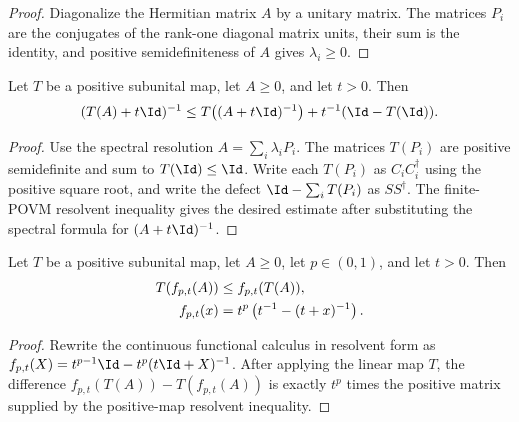 \begin{proof}
    \leanok
    Diagonalize the Hermitian matrix $A$ by a unitary matrix. The matrices
    $P_i$ are the conjugates of the rank-one diagonal matrix units, their sum is
    the identity, and positive semidefiniteness of $A$ gives $\lambda_i\ge0$.
\end{proof}

\begin{lemma}\label{lem:operator_jensen_positive_map_resolvent}
    \leanok
    Let $T$ be a positive subunital map, let $A\ge0$, and let $t>0$. Then
    \begin{align}
        (T(A)+t\Id)^{-1}
        \le
        T\!\left((A+t\Id)^{-1}\right)+t^{-1}(\Id-T(\Id)).
        \notag
    \end{align}
\end{lemma}

\begin{proof}
    \leanok
    Use the spectral resolution $A=\sum_i\lambda_iP_i$. The matrices
    $T(P_i)$ are positive semidefinite and sum to $T(\Id)\le\Id$. Write each
    $T(P_i)$ as $C_iC_i^\dagger$ using the positive square root, and write the
    defect $\Id-\sum_iT(P_i)$ as $SS^\dagger$. The finite-POVM resolvent
    inequality gives the desired estimate after substituting the spectral
    formula for $(A+t\Id)^{-1}$.
\end{proof}

\begin{lemma}
    \label{lem:operator_jensen_positive_map_rpow_integrand}
    \leanok
    Let $T$ be a positive subunital map, let $A\ge0$, let
    $p\in(0,1)$, and let $t>0$. Then
    \begin{align}
        T\!\left(f_{p,t}(A)\right)
        &\le f_{p,t}(T(A)), \notag\\
        f_{p,t}(x)
        &=t^p\left(t^{-1}-(t+x)^{-1}\right).
        \notag
    \end{align}
\end{lemma}

\begin{proof}
    \leanok
    Rewrite the continuous functional calculus in resolvent form as
    $f_{p,t}(X)=t^{p-1}\Id-t^p(t\Id+X)^{-1}$.
    After applying the linear map $T$, the difference
    $f_{p,t}(T(A))-T(f_{p,t}(A))$ is exactly $t^p$ times the positive matrix
    supplied by the positive-map resolvent inequality.
\end{proof}


